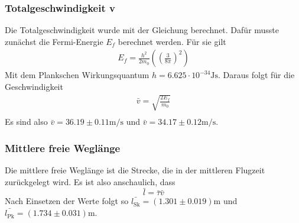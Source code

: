 \subsubsection{Totalgeschwindigkeit v}

Die Totalgeschwindigkeit wurde mit der Gleichung  berechnet.
Dafür musste zunächst die Fermi-Energie $E_f$ berechnet werden. Für sie gilt
\begin{align}
E_f = \frac{h^2}{2 m_0} \left( \left( \frac{3}{8 \pi} \right)^2 \right)
\end{align}
Mit dem Plankschen Wirkungsquantum $h = 6.625 \cdot 10^{-34}\si{\joule\s}$.
Daraus folgt für die Geschwindigkeit
\begin{align*}
\bar{v} = \sqrt{ \frac{2 E_f}{m_0}} \\
\end{align*}
Es sind also $\bar{v} = 36.19 \pm 0.11 \si{\m\per\s}$ und $\bar{v} = 34.17 \pm 0.12 \si{\m\per\s}$.

\subsubsection{Mittlere freie Weglänge}

Die mittlere freie Weglänge ist die Strecke, die in der mittleren Flugzeit
zurückgelegt wird. Es ist also anschaulich, dass 
\begin{equation}
\bar{l} = \bar{ \tau } \bar{v}
\end{equation}
Nach Einsetzen der Werte folgt so $\bar{l_\text{Sk}} = \left( 1.301 \pm 0.019 \right) \si{\m}$
und $\bar{l_\text{Pk}} = \left( 1.734 \pm 0.031 \right) \si{\m}$.
